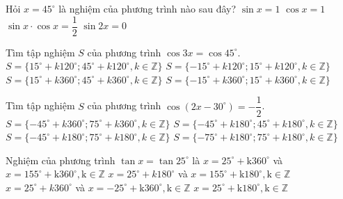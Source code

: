 \begin{ex}%
	Hỏi $x=45^\circ$ là nghiệm của phương trình nào sau đây?
	\choice
	{$\sin x=1$}
	{$\cos x=1$}
	{\True $\sin x\cdot\cos x=\dfrac{1}{2}$}
	{$\sin 2x=0$}

\end{ex}
\begin{ex}%
	Tìm tập nghiệm $S$ của phương trình $\cos 3x = \cos 45^\circ$.
	\choice
	{$S=\{15^\circ + k120^\circ; 45^\circ + k120^\circ, k\in \mathbb{Z}\}$}
	{\True $S=\{-15^\circ + k120^\circ; 15^\circ + k120^\circ, k\in \mathbb{Z}\}$}
	{$S=\{15^\circ + k360^\circ; 45^\circ + k360^\circ, k\in \mathbb{Z}\}$}
	{$S=\{-15^\circ + k360^\circ; 15^\circ + k360^\circ, k\in \mathbb{Z}\}$}
\end{ex}
\begin{ex}%
	Tìm tập nghiệm $S$ của phương trình $\cos \left(2x-30^\circ \right)=-\dfrac{1}{2}$.
	\choice
	{$S=\{-45^\circ + k360^\circ; 75^\circ + k360^\circ, k\in \mathbb{Z}\}$}
	{$S=\{-45^\circ + k180^\circ; 45^\circ + k180^\circ, k\in \mathbb{Z}\}$}
	{\True $S=\{-45^\circ + k180^\circ; 75^\circ + k180^\circ, k\in \mathbb{Z}\}$}
	{$S=\{-75^\circ + k180^\circ; 75^\circ + k180^\circ, k\in \mathbb{Z}\}$}
\end{ex}
\begin{ex}%
Nghiệm của phương trình $\tan x=\tan 25^\circ$ là 
\choice
{$x=25^\circ+\mathrm{k} 360^\circ$ và $x=155^\circ+\mathrm{k} 360^\circ, \mathrm{k} \in \mathbb{Z}$ }
{$x=25^\circ+k 180^\circ$ và $x=155^\circ+\mathrm{k} 180^\circ, \mathrm{k} \in \mathbb{Z}$ }
{$x=25^\circ+k 360^\circ$ và $x=-25^\circ+\mathrm{k} 360^\circ, \mathrm{k} \in \mathbb{Z}$ }
{\True $x=25^\circ+\mathrm{k} 180^\circ, \mathrm{k} \in \mathbb{Z}$ }
\end{ex}


